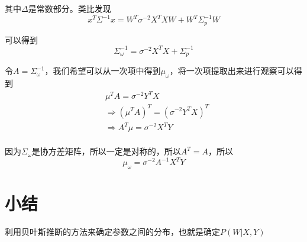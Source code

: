 其中$\varDelta$是常数部分。类比发现
\begin{equation}
    x^T\varSigma^{-1}x=W^T\sigma^{-2}X^TXW+W^T\varSigma^{-1}_pW
\end{equation}

可以得到
\begin{equation}
    \varSigma^{-1}_\omega=\sigma^{-2}X^TX+\varSigma^{-1}_p
\end{equation}

令$A=\varSigma^{-1}_\omega$，我们希望可以从一次项中得到$\mu_\omega$，将一次项提取出来进行观察可以得到
\begin{equation}
    \begin{aligned}
        &\mu^TA=\sigma^{-2}Y^TX\\
        &\Rightarrow (\mu^TA)^T=(\sigma^{-2}Y^TX)^T\\
        &\Rightarrow A^T\mu =\sigma^{-2}X^TY\\
    \end{aligned}
\end{equation}

因为$\varSigma_\omega$是协方差矩阵，所以一定是对称的，所以$A^T=A$，所以
\begin{equation}
    \mu_\omega=\sigma^{-2}A^{-1}X^TY
\end{equation}

\section{小结}

利用贝叶斯推断的方法来确定参数之间的分布，也就是确定$P(W|X,Y)$